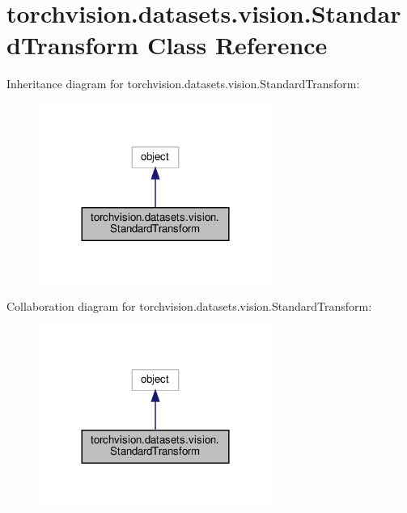 \hypertarget{classtorchvision_1_1datasets_1_1vision_1_1StandardTransform}{}\section{torchvision.\+datasets.\+vision.\+Standard\+Transform Class Reference}
\label{classtorchvision_1_1datasets_1_1vision_1_1StandardTransform}


Inheritance diagram for torchvision.\+datasets.\+vision.\+Standard\+Transform\+:
\nopagebreak
\begin{figure}[H]
\begin{center}
\leavevmode
\includegraphics[width=216pt]{classtorchvision_1_1datasets_1_1vision_1_1StandardTransform__inherit__graph}
\end{center}
\end{figure}


Collaboration diagram for torchvision.\+datasets.\+vision.\+Standard\+Transform\+:
\nopagebreak
\begin{figure}[H]
\begin{center}
\leavevmode
\includegraphics[width=216pt]{classtorchvision_1_1datasets_1_1vision_1_1StandardTransform__coll__graph}
\end{center}
\end{figure}
